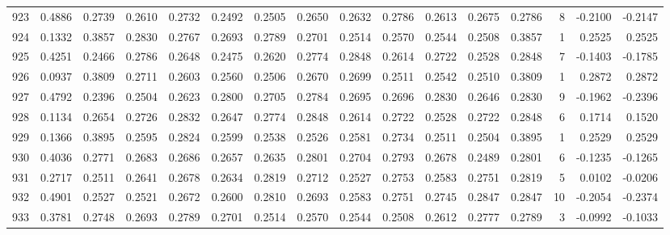 \begin{tabular}{lrrrrrrrrrrrrrrr}
923 &      0.4886 &  0.2739 &  0.2610 &  0.2732 &  0.2492 &  0.2505 &  0.2650 &  0.2632 &  0.2786 &  0.2613 &   0.2675 &     0.2786 &      8 &                   -0.2100 &                    -0.2147 \\
924 &      0.1332 &  0.3857 &  0.2830 &  0.2767 &  0.2693 &  0.2789 &  0.2701 &  0.2514 &  0.2570 &  0.2544 &   0.2508 &     0.3857 &      1 &                    0.2525 &                     0.2525 \\
925 &      0.4251 &  0.2466 &  0.2786 &  0.2648 &  0.2475 &  0.2620 &  0.2774 &  0.2848 &  0.2614 &  0.2722 &   0.2528 &     0.2848 &      7 &                   -0.1403 &                    -0.1785 \\
926 &      0.0937 &  0.3809 &  0.2711 &  0.2603 &  0.2560 &  0.2506 &  0.2670 &  0.2699 &  0.2511 &  0.2542 &   0.2510 &     0.3809 &      1 &                    0.2872 &                     0.2872 \\
927 &      0.4792 &  0.2396 &  0.2504 &  0.2623 &  0.2800 &  0.2705 &  0.2784 &  0.2695 &  0.2696 &  0.2830 &   0.2646 &     0.2830 &      9 &                   -0.1962 &                    -0.2396 \\
928 &      0.1134 &  0.2654 &  0.2726 &  0.2832 &  0.2647 &  0.2774 &  0.2848 &  0.2614 &  0.2722 &  0.2528 &   0.2722 &     0.2848 &      6 &                    0.1714 &                     0.1520 \\
929 &      0.1366 &  0.3895 &  0.2595 &  0.2824 &  0.2599 &  0.2538 &  0.2526 &  0.2581 &  0.2734 &  0.2511 &   0.2504 &     0.3895 &      1 &                    0.2529 &                     0.2529 \\
930 &      0.4036 &  0.2771 &  0.2683 &  0.2686 &  0.2657 &  0.2635 &  0.2801 &  0.2704 &  0.2793 &  0.2678 &   0.2489 &     0.2801 &      6 &                   -0.1235 &                    -0.1265 \\
931 &      0.2717 &  0.2511 &  0.2641 &  0.2678 &  0.2634 &  0.2819 &  0.2712 &  0.2527 &  0.2753 &  0.2583 &   0.2751 &     0.2819 &      5 &                    0.0102 &                    -0.0206 \\
932 &      0.4901 &  0.2527 &  0.2521 &  0.2672 &  0.2600 &  0.2810 &  0.2693 &  0.2583 &  0.2751 &  0.2745 &   0.2847 &     0.2847 &     10 &                   -0.2054 &                    -0.2374 \\
933 &      0.3781 &  0.2748 &  0.2693 &  0.2789 &  0.2701 &  0.2514 &  0.2570 &  0.2544 &  0.2508 &  0.2612 &   0.2777 &     0.2789 &      3 &                   -0.0992 &                    -0.1033 \\

\end{tabular}

